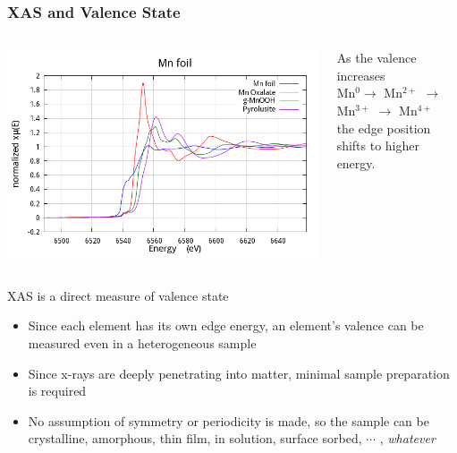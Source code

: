 \documentclass[10pt, xcolor=x11names, compress]{beamer}
\begin{document}
\begin{frame}
  \frametitle{XAS and Valence State}

  \begin{columns}
    \begin{column}{0.5\linewidth}
      \includegraphics[width=\linewidth]{xas/mn_xanes.png}
    \end{column}
    \begin{column}{0.5\linewidth}
      As the valence increases\\[1ex]

      {\color{Blue3}Mn$^0$}$\rightarrow$ 
      \alert{Mn$^{2+}$} $\rightarrow$
      {\color{Green4}Mn$^{3+}$} $\rightarrow$
      {\color{Purple3}Mn$^{4+}$}\\[1ex]

      the edge position shifts to higher energy.
    \end{column}
  \end{columns}    

  \bigskip

  \begin{block}{XAS is a direct measure of valence state}
    \begin{itemize}
    \item Since each element has its own edge energy, an element's
      valence can be measured even in a heterogeneous sample
    \item Since x-rays are deeply penetrating into matter, minimal
      sample preparation is required
    \item No assumption of symmetry or periodicity is made, so the
      sample can be crystalline, amorphous, thin film, in solution,
      surface sorbed, $\cdots$ , \textit{whatever}
    \end{itemize}
  \end{block}

\end{frame}
\end{document}
